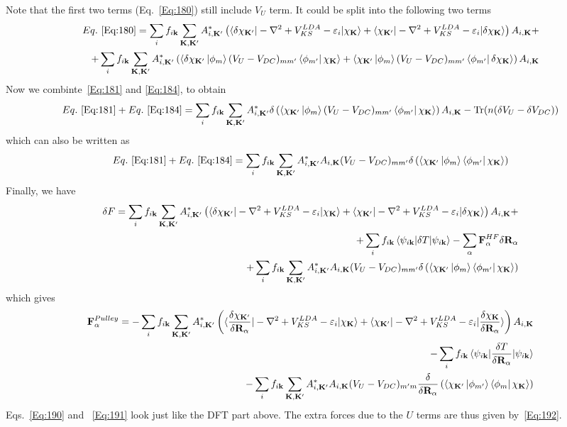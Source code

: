\documentclass[aps,prb,floatfix,epsfig,singlecolumn,showpacs,preprintnumbers]{revtex4}
\newcommand{\vR}{{\mathbf{R}}}
\newcommand{\vF}{{\mathbf{F}}}
\newcommand{\vk}{{\mathbf{k}}}
\newcommand{\vK}{{\mathbf{K}}}
\newcommand{\Tr}{\mathrm{Tr}}
\begin{document}
Note that the first two terms (Eq.~\ref{Eq:180}) still include $V_U$
term. It could be split into the following two terms
\begin{eqnarray}
Eq.~\ref{Eq:180} = 
\sum_{i} f_{i\vk} \sum_{\vK,\vK'}
A_{i,\vK'}^* \left(\braket{\delta \chi_{\vK'}|-\nabla^2+V_{KS}^{LDA}-\varepsilon_i|\chi_{\vK}}+
                         \braket{\chi_{\vK'}|-\nabla^2+V_{KS}^{LDA}-\varepsilon_i|\delta\chi_{\vK}}
\right)A_{i,\vK}+\\
+\sum_{i} f_{i\vk} \sum_{\vK,\vK'}
A_{i,\vK'}^* \left(\braket{\delta  \chi_{\vK'} \ket{\phi_m}(V_U-V_{DC})_{mm'}\bra{\phi_{m'}}\chi_{\vK}}+
\braket{\chi_{\vK'}\ket{\phi_m}(V_U-V_{DC})_{mm'}\bra{\phi_{m'}} \delta\chi_{\vK}}\right)A_{i,\vK}
\label{Eq:184}
\end{eqnarray}
Now we combinte~\ref{Eq:181} and \ref{Eq:184}, to obtain
\begin{eqnarray}
Eq.~\ref{Eq:181}+Eq.~\ref{Eq:184}=
\sum_{i} f_{i\vk} \sum_{\vK,\vK'}
A_{i,\vK'}^* \delta \left(\braket{\chi_{\vK'} \ket{\phi_m}(V_U-V_{DC})_{mm'}\bra{\phi_{m'}}\chi_{\vK}}\right)A_{i,\vK}
-\Tr(n(\delta V_U-\delta V_{DC}))
\end{eqnarray}
which can also be written as
\begin{eqnarray}
Eq.~\ref{Eq:181}+Eq.~\ref{Eq:184}=
\sum_{i} f_{i\vk} \sum_{\vK,\vK'}
A_{i,\vK'}^* 
A_{i,\vK}
(V_U-V_{DC})_{mm'}
\delta \left(\braket{\chi_{\vK'} \ket{\phi_m}\bra{\phi_{m'}}\chi_{\vK}}\right)
\end{eqnarray}
Finally, we have
\begin{eqnarray}
\delta F = 
\sum_{i} f_{i\vk} \sum_{\vK,\vK'}
A_{i,\vK'}^* \left(\braket{\delta \chi_{\vK'}|-\nabla^2+V_{KS}^{LDA}-\varepsilon_i|\chi_{\vK}}+
                         \braket{\chi_{\vK'}|-\nabla^2+V_{KS}^{LDA}-\varepsilon_i|\delta\chi_{\vK}}
\right)A_{i,\vK}+\\
+\sum_i f_{i\vk}\braket{\psi_{i\vk}|\delta  T|\psi_{i\vk}}
-\sum_\alpha\vF^{HF}_\alpha\delta \vR_\alpha \\
+\sum_{i} f_{i\vk} \sum_{\vK,\vK'}
A_{i,\vK'}^* 
A_{i,\vK}
(V_U-V_{DC})_{mm'}
\delta \left(\braket{\chi_{\vK'} \ket{\phi_m}\bra{\phi_{m'}}\chi_{\vK}}\right)
\end{eqnarray}
which gives
\begin{eqnarray}
\vF^{Pulley}_\alpha = 
-\sum_{i} f_{i\vk} \sum_{\vK,\vK'}
A_{i,\vK'}^* \left(\braket{\frac{\delta\chi_{\vK'}}{\delta\vR_\alpha} |-\nabla^2+V_{KS}^{LDA}-\varepsilon_i|\chi_{\vK}}+
                         \braket{\chi_{\vK'}|-\nabla^2+V_{KS}^{LDA}-\varepsilon_i|\frac{\delta \chi_{\vK}}{\delta \vR_\alpha}}
\right)A_{i,\vK}\label{Eq:190}\\
-\sum_i f_{i\vk}\braket{\psi_{i\vk}|\frac{\delta T}{\delta \vR_\alpha} |\psi_{i\vk}}\label{Eq:191}\\
-\sum_{i} f_{i\vk} \sum_{\vK,\vK'}
A_{i,\vK'}^* 
A_{i,\vK}
(V_U-V_{DC})_{m'm}
\frac{\delta}{\delta\vR_\alpha} \left(\braket{\chi_{\vK'} \ket{\phi_{m'}}\bra{\phi_{m}}\chi_{\vK}}\right)
\label{Eq:192}
\end{eqnarray}
Eqs.~\ref{Eq:190} and ~\ref{Eq:191} look just like the DFT part
above. The extra forces due to the $U$ terms are thus given by~\ref{Eq:192}.
\end{document}
